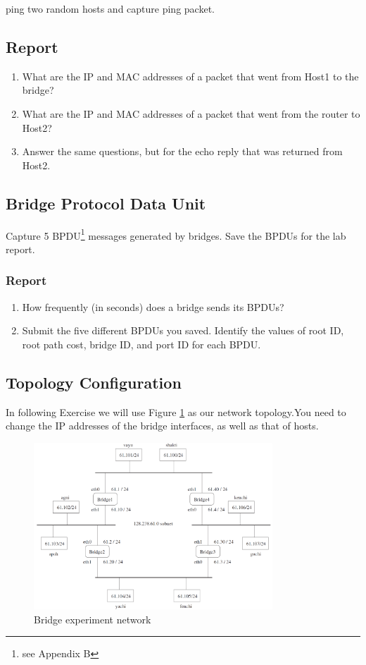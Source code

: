 \documentclass[10pt,a4paper]{article}
\numberwithin{equation}{section}
\numberwithin{figure}{section}
\numberwithin{table}{section}
\begin{document}
    ping two random hosts and capture ping packet.		

    \subsection*{Report}
    \begin{enumerate}
        \item What are the IP and MAC addresses of a packet that went from Host1 to the bridge? 
        \item What are the IP and MAC addresses of a packet that went from the router to Host2?
        \item Answer the same questions, but for the echo reply that was returned from Host2.
    \end{enumerate}

\subsection{Bridge Protocol Data Unit}
   Capture 5 BPDU\footnote{see Appendix B} messages generated by bridges. Save the BPDUs for the lab report.
    \subsubsection*{Report}
    \begin{enumerate}
        \item How frequently (in seconds) does a bridge sends its BPDUs?
        \item Submit the five different BPDUs you saved. Identify the values of root ID, root path cost, bridge ID, and port ID for each BPDU.
    \end{enumerate}
    
\pagebreak
\subsection{Topology Configuration}
   In following Exercise we will use Figure \ref{fig:bridge-ex} as our network topology.You need to change the IP addresses of the bridge interfaces, as well as that of hosts.

\begin{figure}[H]
    \centering
    \includegraphics[width=0.8\textwidth]{img/fig4.png}
    \caption{Bridge experiment network}
    \label{fig:bridge-ex}
\end{figure}
\end{document}

